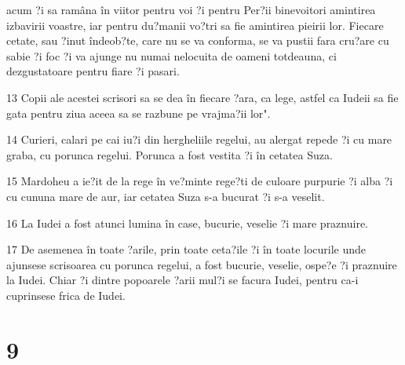 acum ?i sa ramâna în viitor pentru voi ?i pentru Per?ii binevoitori amintirea izbavirii voastre, iar pentru du?manii vo?tri sa fie amintirea pieirii lor. Fiecare cetate, sau ?inut îndeob?te, care nu se va conforma, se va pustii fara cru?are cu sabie ?i foc ?i va ajunge nu numai nelocuita de oameni totdeauna, ci dezgustatoare pentru fiare ?i pasari.
\par 13 Copii ale acestei scrisori sa se dea în fiecare ?ara, ca lege, astfel ca Iudeii sa fie gata pentru ziua aceea sa se razbune pe vrajma?ii lor".
\par 14 Curieri, calari pe cai iu?i din hergheliile regelui, au alergat repede ?i cu mare graba, cu porunca regelui. Porunca a fost vestita ?i în cetatea Suza.
\par 15 Mardoheu a ie?it de la rege în ve?minte rege?ti de culoare purpurie ?i alba ?i cu cununa mare de aur, iar cetatea Suza s-a bucurat ?i s-a veselit.
\par 16 La Iudei a fost atunci lumina în case, bucurie, veselie ?i mare praznuire.
\par 17 De asemenea în toate ?arile, prin toate ceta?ile ?i în toate locurile unde ajunsese scrisoarea cu porunca regelui, a fost bucurie, veselie, ospe?e ?i praznuire la Iudei. Chiar ?i dintre popoarele ?arii mul?i se facura Iudei, pentru ca-i cuprinsese frica de Iudei.

\chapter{9}

